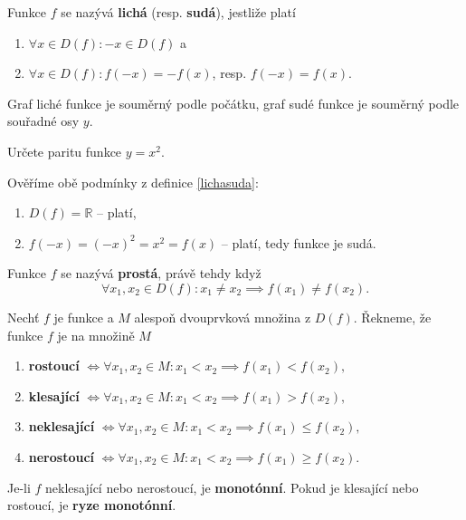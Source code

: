 \begin{definition}\label{lichasuda}
  Funkce $f$ se nazývá \textbf{lichá} (resp. \textbf{sudá}), jestliže platí
  \begin{enumerate}[$i.$]
    \item $\forall x \in D(f): -x \in D(f)$ a
  	\item $\forall x \in D(f): f(-x)=-f(x)$, resp. $f(-x)=f(x)$.
  \end{enumerate}
\end{definition}

\begin{pozn}
  Graf liché funkce je souměrný podle počátku, graf sudé funkce je souměrný podle souřadné osy $y$.
\end{pozn}

\begin{priklad}
Určete paritu funkce $y=x^2$.
\end{priklad}

\begin{reseni}
Ověříme obě podmínky z definice \ref{lichasuda}:
\begin{enumerate}[$i.$]
\item $D(f)=\mathbb R$ -- platí,
\item $f(-x)=(-x)^2=x^2=f(x)$ -- platí, tedy funkce je sudá.
\end{enumerate}
\end{reseni}

\begin{definition}
  Funkce $f$ se nazývá \textbf{prostá}, právě tehdy když
  \[
    \forall x_1,x_2\in D(f): x_1\ne x_2 \implies f(x_1)\ne f(x_2).
  \]
\end{definition}

\begin{definition}
  Nechť $f$ je funkce a $M$ alespoň dvouprvková množina z $D(f)$. Řekneme, že funkce $f$ je na množině $M$
  \begin{enumerate}[$i.$]
    \item \textbf{rostoucí} $\iff \forall x_1, x_2 \in M: x_1 < x_2 \implies f(x_1) < f(x_2),$
    \item \textbf{klesající} $\iff \forall x_1, x_2 \in M: x_1 < x_2 \implies f(x_1) > f(x_2),$
    \item \textbf{neklesající} $\iff \forall x_1, x_2 \in M: x_1 < x_2 \implies f(x_1) \leq f(x_2),$
    \item \textbf{nerostoucí} $\iff \forall x_1, x_2 \in M: x_1 < x_2 \implies f(x_1) \geq f(x_2).$
  \end{enumerate}
  Je-li $f$ neklesající nebo nerostoucí, je \textbf{monotónní}. Pokud je klesající nebo rostoucí, je \textbf{ryze monotónní}.
\end{definition}

